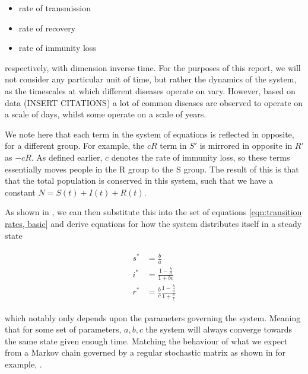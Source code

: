 \documentclass[10pt,showpacs,preprintnumbers,amsmath,amssymb,nofootinbib,aps,prl,twocolumn,groupedaddress,superscriptaddress,showkeys]{revtex4-1}
\begin{document}
    \begin{itemize}
      \item rate of transmission
      \item rate of recovery
      \item rate of immunity loss
    \end{itemize}

    respectively, with dimension inverse time. For the purposes of this report, we will not consider any particular unit of time, but rather the dynamics of the system, as the timescales at which different diseases operate on vary. However, based on data (INSERT CITATIONS) a lot of common diseases are observed to operate on a scale of days, whilst some operate on a scale of years. 

    We note here that each term in the system of equations is reflected in opposite, for a different group. For example, the $cR$ term in $S'$ is mirrored in opposite in $R'$ as $-cR$. As defined earlier, $c$ denotes the rate of immunity loss, so these terms essentially moves people in the R group to the S group.
    The result of this is that that the total population is conserved in this system, such that we have a constant $N = S(t) + I(t) + R(t)$.

    As shown in \textcite{project5}, we can then substitute this into the set of equations \ref{eqn:transition rates, basic} and derive equations for how the system distributes itself in a steady state

    \begin{align}
      \begin{split}
        s^* &= \frac{b}{a}  \\
        i^* &= \frac{1 - \frac{b}{a}}{1 + {b}{c}} \\
        r^* &= \frac{b}{c}\frac{1 - \frac{b}{a}}{1 + \frac{b}{c}}
      \end{split}
    \end{align}

    which notably only depends upon the parameters governing the system. Meaning that for some set of parameters, $a,b,c$ the system will always converge towards the same state given enough time. Matching the behaviour of what we expect from a Markov chain governed by a regular stochastic matrix as shown in for example, \textcite[p.~277, theorem~18]{linalg_lays}.
\end{document}
